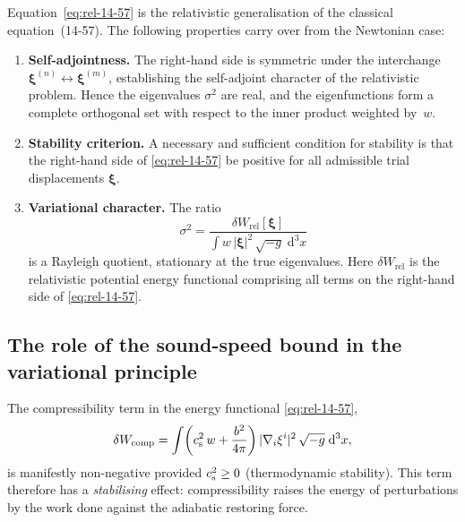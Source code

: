 Equation~\eqref{eq:rel-14-57} is the relativistic generalisation of
the classical equation~(14-57).  The following properties carry over
from the Newtonian case:

\begin{enumerate}
\item \textbf{Self-adjointness.}  The right-hand side is symmetric
  under the interchange
  $\boldsymbol{\xi}^{(n)} \leftrightarrow \boldsymbol{\xi}^{(m)}$,
  establishing the self-adjoint character of the relativistic problem.
  Hence the eigenvalues $\sigma^{2}$ are real, and the eigenfunctions
  form a complete orthogonal set with respect to the inner product
  weighted by~$w$.

\item \textbf{Stability criterion.}  A necessary and sufficient
  condition for stability is that the right-hand side of
  \eqref{eq:rel-14-57} be positive for all admissible trial
  displacements $\boldsymbol{\xi}$.

\item \textbf{Variational character.}  The ratio
  \begin{equation}\label{eq:rel-14-Rayleigh}
    \sigma^{2}
    = \frac{\delta W_{\mathrm{rel}}[\boldsymbol{\xi}]}
           {\displaystyle\int w\,|\boldsymbol{\xi}|^{2}\,
             \sqrt{-g}\;\mathrm{d}^{3}x}
  \end{equation}
  is a Rayleigh quotient, stationary at the true eigenvalues.  Here
  $\delta W_{\mathrm{rel}}$ is the relativistic potential energy
  functional comprising all terms on the right-hand side of
  \eqref{eq:rel-14-57}.
\end{enumerate}

\subsection{The role of the sound-speed bound in the variational
  principle}\label{sec:rel-123d}

The compressibility term in the energy functional
\eqref{eq:rel-14-57},
\begin{equation}\label{eq:rel-14-compress-term}
  \delta W_{\mathrm{comp}}
  = \int \!\left(c_{\mathrm{s}}^{2}\,w
    + \frac{b^{2}}{4\pi}\right)
    |\nabla_{i}\xi^{i}|^{2}\,
    \sqrt{-g}\;\mathrm{d}^{3}x,
\end{equation}
is manifestly non-negative provided $c_{\mathrm{s}}^{2} \ge 0$ (thermodynamic
stability).  This term therefore has a \emph{stabilising} effect:
compressibility raises the energy of perturbations by the work done
against the adiabatic restoring force.

